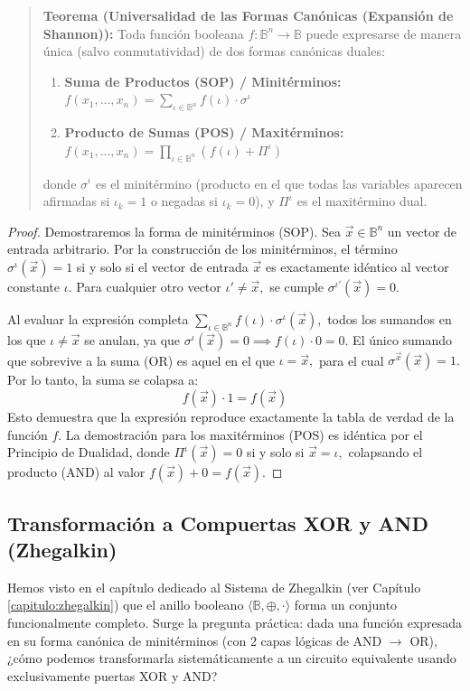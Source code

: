 \begin{quote}\textbf{Teorema (Universalidad de las Formas Canónicas (Expansión de Shannon)):}\label{shannon_expansion}
Toda función booleana $f: \mathbb{B}^n \to \mathbb{B}$ puede expresarse de manera única (salvo conmutatividad) de dos formas canónicas duales:
\begin{enumerate}
    \item \textbf{Suma de Productos (SOP) / Minitérminos:} $f(x_1, \dots, x_n) = \sum_{\iota \in \mathbb{B}^n} f(\iota) \cdot \sigma^\iota$
    \item \textbf{Producto de Sumas (POS) / Maxitérminos:} $f(x_1, \dots, x_n) = \prod_{\iota \in \mathbb{B}^n} (f(\iota) + \Pi^\iota)$
\end{enumerate}
donde $\sigma^\iota$ es el minitérmino (producto en el que todas las variables aparecen afirmadas si $\iota_k=1$ o negadas si $\iota_k=0$), y $\Pi^\iota$ es el maxitérmino dual.
\end{quote}
\begin{proof}
Demostraremos la forma de minitérminos (SOP). Sea $\vec{x} \in \mathbb{B}^n$ un vector de entrada arbitrario. Por la construcción de los minitérminos, el término $\sigma^\iota(\vec{x}) = 1$ si y solo si el vector de entrada $\vec{x}$ es exactamente idéntico al vector constante $\iota.$ Para cualquier otro vector $\iota' \ne \vec{x},$ se cumple $\sigma^{\iota'}(\vec{x}) = 0.$

Al evaluar la expresión completa $\sum_{\iota \in \mathbb{B}^n} f(\iota) \cdot \sigma^\iota(\vec{x}),$ todos los sumandos en los que $\iota \ne \vec{x}$ se anulan, ya que $\sigma^\iota(\vec{x}) = 0 \implies f(\iota) \cdot 0 = 0.$ El único sumando que sobrevive a la suma (OR) es aquel en el que $\iota = \vec{x},$ para el cual $\sigma^{\vec{x}}(\vec{x}) = 1.$ Por lo tanto, la suma se colapsa a:
\[ f(\vec{x}) \cdot 1 = f(\vec{x}) \]
Esto demuestra que la expresión reproduce exactamente la tabla de verdad de la función $f.$ La demostración para los maxitérminos (POS) es idéntica por el Principio de Dualidad, donde $\Pi^\iota(\vec{x}) = 0$ si y solo si $\vec{x} = \iota,$ colapsando el producto (AND) al valor $f(\vec{x}) + 0 = f(\vec{x}).$
\end{proof}

\subsection{Transformación a Compuertas XOR y AND (Zhegalkin)}

Hemos visto en el capítulo dedicado al Sistema de Zhegalkin (ver Capítulo \ref{capitulo:zhegalkin}) que el anillo booleano $\langle \mathbb{B}, \oplus, \cdot \rangle$ forma un conjunto funcionalmente completo. Surge la pregunta práctica: dada una función expresada en su forma canónica de minitérminos (con 2 capas lógicas de AND $\to$ OR), ¿cómo podemos transformarla sistemáticamente a un circuito equivalente usando exclusivamente puertas XOR y AND?

